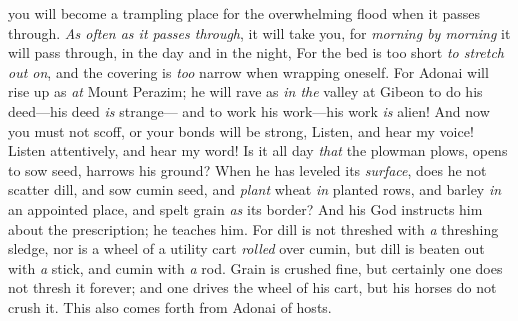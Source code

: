 \begin{biblechapter}
you will become a trampling place for the overwhelming flood when it passes through.
\verse \textit{As often as it passes through}, it will take you, 
for \textit{morning by morning} it will pass through, 
in the day and in the night,
\verse For the bed is too short \textit{to stretch out on}, 
and the covering is \textit{too} narrow when wrapping oneself.
\verse For Adonai will rise up as \textit{at} Mount Perazim; 
he will rave as \textit{in the} valley at Gibeon 
to do his deed—his deed \textit{is} strange— 
and to work his work—his work \textit{is} alien!
\verse And now you must not scoff, 
or your bonds will be strong,
 Listen, and hear my voice! 
Listen attentively, and hear my word!
\verse Is it all day \textit{that} the plowman plows, 
opens to sow seed, harrows his ground?
\verse When he has leveled its \textit{surface}, does he not scatter dill, 
and sow cumin seed, 
and \textit{plant} wheat \textit{in} planted rows, 
and barley \textit{in} an appointed place, 
and spelt grain \textit{as} its border?
\verse And his God instructs him about the prescription; 
he teaches him.
\verse For dill is not threshed with \textit{a} threshing sledge, 
nor is a wheel of a utility cart \textit{rolled} over cumin, 
but dill is beaten out with \textit{a} stick, 
and cumin with \textit{a} rod.
\verse Grain is crushed fine, 
but certainly one does not thresh it forever; 
and one drives the wheel of his cart, 
but his horses do not crush it.
\verse This also comes forth from Adonai of hosts.
\end{biblechapter}

